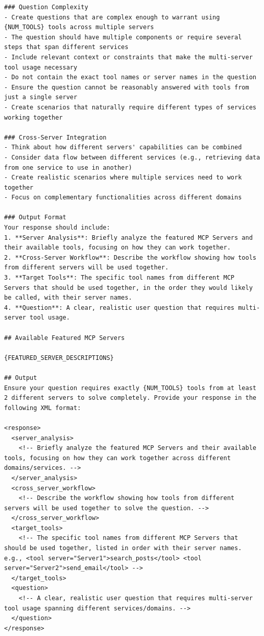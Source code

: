 \begin{verbatim}
### Question Complexity
- Create questions that are complex enough to warrant using {NUM_TOOLS} tools across multiple servers
- The question should have multiple components or require several steps that span different services
- Include relevant context or constraints that make the multi-server tool usage necessary
- Do not contain the exact tool names or server names in the question
- Ensure the question cannot be reasonably answered with tools from just a single server
- Create scenarios that naturally require different types of services working together

### Cross-Server Integration
- Think about how different servers' capabilities can be combined
- Consider data flow between different services (e.g., retrieving data from one service to use in another)
- Create realistic scenarios where multiple services need to work together
- Focus on complementary functionalities across different domains

### Output Format
Your response should include:
1. **Server Analysis**: Briefly analyze the featured MCP Servers and their available tools, focusing on how they can work together.
2. **Cross-Server Workflow**: Describe the workflow showing how tools from different servers will be used together.
3. **Target Tools**: The specific tool names from different MCP Servers that should be used together, in the order they would likely be called, with their server names.
4. **Question**: A clear, realistic user question that requires multi-server tool usage.

## Available Featured MCP Servers

{FEATURED_SERVER_DESCRIPTIONS}

## Output
Ensure your question requires exactly {NUM_TOOLS} tools from at least 2 different servers to solve completely. Provide your response in the following XML format:

<response>
  <server_analysis>
    <!-- Briefly analyze the featured MCP Servers and their available tools, focusing on how they can work together across different domains/services. -->
  </server_analysis>
  <cross_server_workflow>
    <!-- Describe the workflow showing how tools from different servers will be used together to solve the question. -->
  </cross_server_workflow>
  <target_tools>
    <!-- The specific tool names from different MCP Servers that should be used together, listed in order with their server names. e.g., <tool server="Server1">search_posts</tool> <tool server="Server2">send_email</tool> -->
  </target_tools>
  <question>
    <!-- A clear, realistic user question that requires multi-server tool usage spanning different services/domains. -->
  </question>
</response> 
\end{verbatim}

